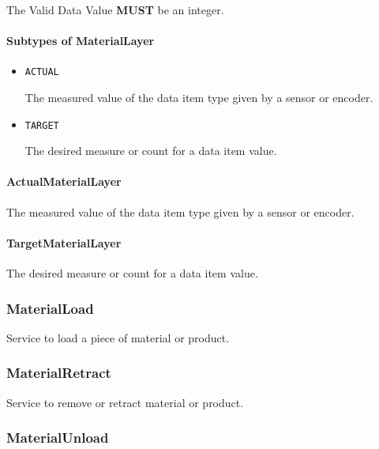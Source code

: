  The \gls{Valid Data Value} \textbf{MUST} be an integer.


\paragraph{Subtypes of MaterialLayer}\mbox{}
\label{sec:Subtypes of MaterialLayer}

\begin{itemize}

\item \texttt{ACTUAL}


The measured value of the data item type given by a sensor or encoder.

\item \texttt{TARGET}


The desired measure or count for a data item value.


\end{itemize}

\paragraph{ActualMaterialLayer}\mbox{}
\label{sec:ActualMaterialLayer}


The measured value of the data item type given by a sensor or encoder.


\paragraph{TargetMaterialLayer}\mbox{}
\label{sec:TargetMaterialLayer}


The desired measure or count for a data item value.


\subsubsection{MaterialLoad}
\label{sec:MaterialLoad}



Service to load a piece of material or product.


\subsubsection{MaterialRetract}
\label{sec:MaterialRetract}



Service to remove or retract material or product.


\subsubsection{MaterialUnload}
\label{sec:MaterialUnload}



